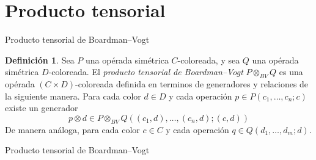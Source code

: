 \documentclass[12pt,aspectratio=169]{beamer}
\numberwithin{equation}{section}
\theoremstyle{definition}
\newtheorem{defi}[teo]{Definici\'on}
\begin{document}
{\section{Producto tensorial}

\begin{frame}{Producto tensorial de Boardman--Vogt}
    \begin{defi}
        Sea $P$ una op\'erada sim\'etrica $C$-coloreada, y sea $Q$ una op\'erada sim\'etrica $D$-coloreada. El \emph{producto tensorial de Boardman--Vogt} $P\otimes_{BV}Q$ es una op\'erada $(C\times D)$-coloreada definida en terminos de generadores y relaciones de la siguiente manera.
        Para cada color $d\in D$ y cada operaci\'on $p\in P(c_1,\dots,c_n;c)$ existe un generador
        $$
            p \otimes d \in P\otimes_{BV}Q((c_1,d),\dots,(c_n,d);(c,d))
        $$
        De manera an\'aloga, para cada color $c\in C$ y cada operaci\'on $q\in Q(d_1,\dots,d_m;d)$. %
    \end{defi}
\end{frame}
\begin{frame}{Producto tensorial de Boardman--Vogt}


\end{frame}}
\end{document}
